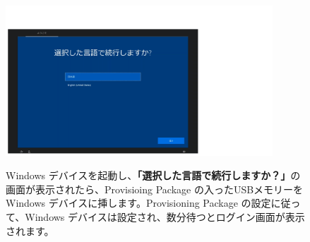 \begin{figure}[hp]
    \begin{minipage}{0.6\textwidth}
        \vspace{-1cm}
        \includegraphics[width=10cm]{figures/Deploy-02.png}
    \end{minipage}
    \begin{minipage}{0.4\textwidth}
        Windows デバイスを起動し、\textbf{「選択した言語で続行しますか？」}の画面が表示されたら、Provisioing Package の入ったUSBメモリーをWindows デバイスに挿します。Provisioning Package の設定に従って、Windows デバイスは設定され、数分待つとログイン画面が表示されます。
    \end{minipage}
    \vspace{6cm}
\end{figure}


